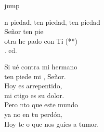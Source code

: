 \begin{cancion}jump\\
	\begin{chorus}%
		n piedad, ten piedad, ten piedad\\
		Señor ten pie \\
		otra  he pado con Ti (**)\\
		. ed.\jump\\
	\end{chorus}%
	Si ué contra mi hermano \\
	ten piede mi , Señor.\\
	Hoy es arrepentido, \\
	mi ctigo es su dolor.\\
	Pero nto que este mundo \\
	ya no  en tu perdón,\\
	Hoy te o que nos guíes a tumor.\\
\end{cancion}%
